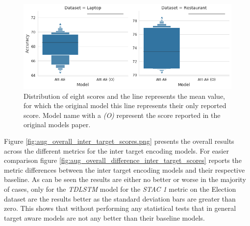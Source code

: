 \begin{figure}[h!]
    \centering
    \includegraphics[scale=0.5]{images/augmentation/methods_performance/Inter_Target/inter_target_reproducability.png}
    \caption{Distribution of eight scores and the line represents the mean value, for which the original model this line represents their only reported score. Model name with a \textit{(O)} represent the score reported in the original models paper.}
    \label{fig:aug_inter_target_reproducability}
\end{figure}

Figure \ref{fig:aug_overall_inter_target_scores.png} presents the overall results across the different metrics for the inter target encoding models. For easier comparison figure \ref{fig:aug_overall_difference_inter_target_scores} reports the metric differences between the inter target encoding models and their respective baseline. As can be seen the results are either no better or worse in the majority of cases, only for the \textit{TDLSTM} model for the \textit{STAC 1} metric on the Election dataset are the results better as the standard deviation bars are greater than zero. This shows that without performing any statistical tests that in general target aware models are not any better than their baseline models. 

